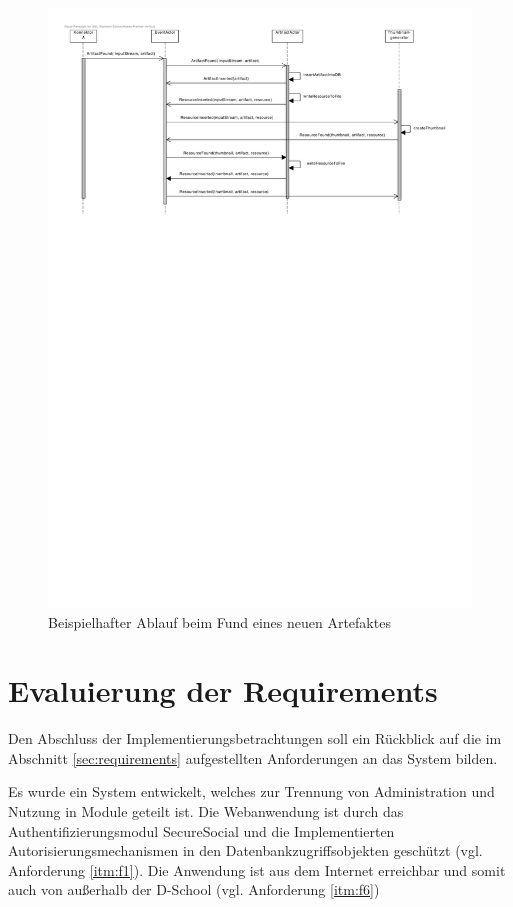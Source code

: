 \begin{figure}[h]  
  \centering     
  \includegraphics[width=1.0\textwidth]{img/eventsystem_bsp.pdf}  
   \caption{Beispielhafter Ablauf beim Fund eines neuen Artefaktes}   
  \label{fig:eventsystem-bsp} 
\end{figure}

\section{Evaluierung der Requirements}

Den Abschluss der Implementierungsbetrachtungen soll ein Rückblick auf die im Abschnitt \ref{sec:requirements} aufgestellten Anforderungen an das System bilden.

Es wurde ein System entwickelt, welches zur Trennung von Administration und Nutzung in Module geteilt ist. Die Webanwendung ist durch das Authentifizierungsmodul SecureSocial und die Implementierten Autorisierungsmechanismen in den Datenbankzugriffsobjekten geschützt (vgl. Anforderung \ref{itm:f1}). Die Anwendung ist aus dem Internet erreichbar und somit auch von außerhalb der D-School (vgl. Anforderung \ref{itm:f6})

